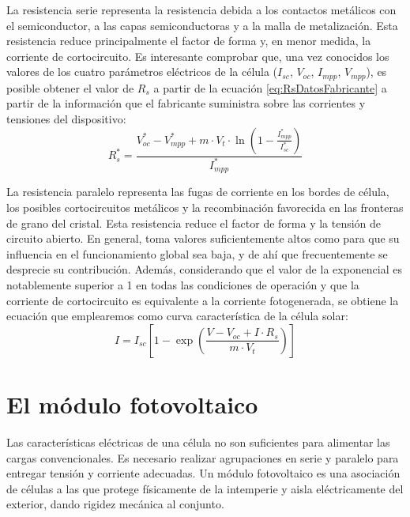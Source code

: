 La resistencia serie representa la resistencia debida a los contactos
metálicos con el semiconductor, a las capas semiconductoras y a la
malla de metalización. Esta resistencia reduce principalmente el factor
de forma y, en menor medida, la corriente de cortocircuito. Es interesante
comprobar que, una vez conocidos los valores de los cuatro parámetros
eléctricos de la célula ($I_{sc}$, $V_{oc}$, $I_{mpp}$, $V_{mpp}$),
es posible obtener el valor de $R_{s}$
a partir de la ecuación \ref{eq:RsDatosFabricante} a partir de la
información que el fabricante suministra sobre las corrientes y tensiones
del dispositivo: \begin{equation}
R_{s}^{*}=\frac{V_{oc}^{*}-V_{mpp}^{*}+m\cdot
  V_{t}\cdot\ln(1-\frac{I_{mpp}^{*}}{I_{sc}^{*}})}{I_{mpp}^{*}}
\label{eq:RsDatosFabricante}
\end{equation}

La resistencia paralelo representa las fugas de corriente en los bordes
de célula, los posibles cortocircuitos metálicos y la recombinación
favorecida en las fronteras de grano del cristal. Esta resistencia
reduce el factor de forma y la tensión de circuito abierto. En general,
toma valores suficientemente altos como para que su influencia en
el funcionamiento global sea baja, y de ahí que frecuentemente se
desprecie su contribución. Además, considerando que el valor de la
exponencial es notablemente superior a 1 en todas las condiciones
de operación y que la corriente de cortocircuito es equivalente a
la corriente fotogenerada, se obtiene la ecuación que emplearemos
como curva característica de la célula solar: \begin{equation}
I=I_{sc}[1-\exp(\frac{V-V_{oc}+I\cdot R_{s}}{m\cdot V_{t}})]\label{eq:EcuacionCelulaFinal}\end{equation}



\section{El módulo fotovoltaico}

Las características eléctricas de una célula no son suficientes para
alimentar las cargas convencionales. Es necesario realizar agrupaciones
en serie y paralelo para entregar tensión y corriente adecuadas. Un
módulo fotovoltaico es una asociación de células a las que protege
físicamente de la intemperie y aisla eléctricamente del exterior,
dando rigidez mecánica al conjunto. 

